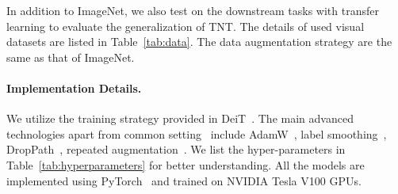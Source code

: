 \documentclass{article}
\begin{document}
In addition to ImageNet, we also test on the downstream tasks with transfer learning to evaluate the generalization of TNT. The details of used visual datasets are listed in Table~\ref{tab:data}. The data augmentation strategy are the same as that of ImageNet.
\begin{table}[htp]
	\small 
	\centering
	\caption{Details of used visual datasets.}\label{tab:data}
	\renewcommand{\arraystretch}{1.0}
	\vspace{-1.0em}
\end{table}


\paragraph{Implementation Details.}
We utilize the training strategy provided in DeiT~\cite{deit}. The main advanced technologies apart from common setting~\cite{resnet} include AdamW~\cite{adamw}, label smoothing~\cite{label-smooth}, DropPath~\cite{larsson2016fractalnet}, repeated augmentation~\cite{hoffer2020augment}.
We list the hyper-parameters in Table~\ref{tab:hyperparameters} for better understanding. All the models are implemented using PyTorch~\cite{pytorch} and trained on NVIDIA Tesla V100 GPUs.

\begin{table}[htp]
	\vspace{-0em}
	\small 
	\centering
	\caption{Default training hyper-parameters used in our method, unless stated otherwise.}\label{tab:hyperparameters}
	\renewcommand{\arraystretch}{1.05}
	\vspace{-1.0em}
\end{table}
\end{document}
